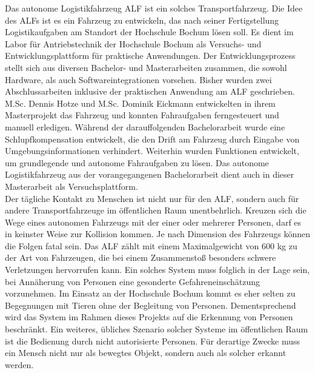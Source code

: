 		Das autonome Logistikfahrzeug ALF ist ein solches Transportfahrzeug. Die Idee des ALFs ist es ein Fahrzeug zu entwickeln, das nach seiner Fertigstellung Logistikaufgaben am Standort der Hochschule Bochum lösen soll. Es dient im Labor für Antriebstechnik der Hochschule Bochum als Versuchs- und Entwicklungsplattform für praktische Anwendungen. Der Entwicklungsprozess stellt sich aus diversen Bachelor- und Masterarbeiten zusammen, die sowohl Hardware, als auch Softwareintegrationen vorsehen. Bisher wurden zwei Abschlussarbeiten inklusive der praktischen Anwendung am ALF geschrieben. M.Sc. Dennis Hotze und M.Sc. Dominik Eickmann entwickelten in ihrem Masterprojekt das Fahrzeug und konnten Fahraufgaben ferngesteuert und manuell erledigen. Während der darauffolgenden Bachelorarbeit wurde eine Schlupfkompensation entwickelt, die den Drift am Fahrzeug durch Eingabe von Umgebungsinformationen verhindert. Weiterhin wurden Funktionen entwickelt, um grundlegende und autonome Fahraufgaben zu lösen. Das autonome Logistikfahrzeug aus der vorangegangenen Bachelorarbeit dient auch in dieser Masterarbeit als Versuchsplattform.\\
		
		Der tägliche Kontakt zu Menschen ist nicht nur für den ALF, sondern auch für andere Transportfahrzeuge im öffentlichen Raum unentbehrlich. Kreuzen sich die Wege eines autonomen Fahrzeugs mit der einer oder mehrerer Personen, darf es in keinster Weise zur Kollision kommen. Je nach Dimension des Fahrzeugs können die Folgen fatal sein. Das ALF zählt mit einem Maximalgewicht von 600 kg zu der Art von Fahrzeugen, die bei einem Zusammenstoß besonders schwere Verletzungen hervorrufen kann. Ein solches System muss folglich in der Lage sein, bei Annäherung von Personen eine gesonderte Gefahreneinschätzung vorzunehmen. Im Einsatz an der Hochschule Bochum kommt es eher selten zu Begegnungen mit Tieren ohne der Begleitung von Personen. Dementsprechend wird das System im Rahmen dieses Projekts auf die Erkennung von Personen beschränkt. Ein weiteres, übliches Szenario solcher Systeme im öffentlichen Raum ist die Bedienung durch nicht autorisierte Personen. Für derartige Zwecke muss ein Mensch nicht nur als bewegtes Objekt, sondern auch als solcher erkannt werden. \\
		

